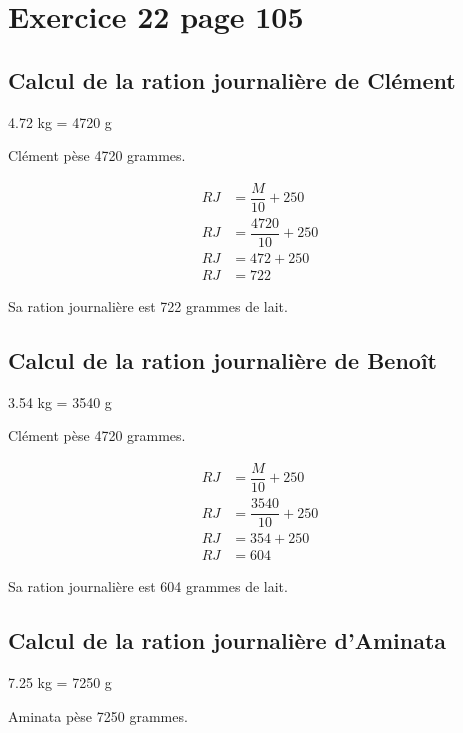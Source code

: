 \documentclass[12pt,a4paper]{article}
\begin{document}
\section*{Exercice 22 page 105}

\subsection*{Calcul de la ration journalière de Clément}

\num{4.72} kg = \num{4720} g

Clément pèse 4720 grammes.

\vspace*{-0.5cm}

\begin{align*}
	RJ &= \dfrac{M}{10} + 250 \\
	RJ &= \dfrac{4720}{10} + 250 \\
	RJ &= 472 + 250 \\
	RJ &= 722
\end{align*}

Sa ration journalière est 722 grammes de lait.

\newpage

\subsection*{Calcul de la ration journalière de Benoît}

\num{3.54} kg = \num{3540} g

Clément pèse 4720 grammes.

\vspace*{-0.5cm}

\begin{align*}
	RJ &= \dfrac{M}{10} + 250 \\
	RJ &= \dfrac{3540}{10} + 250 \\
	RJ &= 354 + 250 \\
	RJ &= 604
\end{align*}

Sa ration journalière est 604 grammes de lait.


\subsection*{Calcul de la ration journalière d'Aminata}

\num{7.25} kg = \num{7250} g

Aminata pèse 7250 grammes.

\vspace*{-0.5cm}
\end{document}
